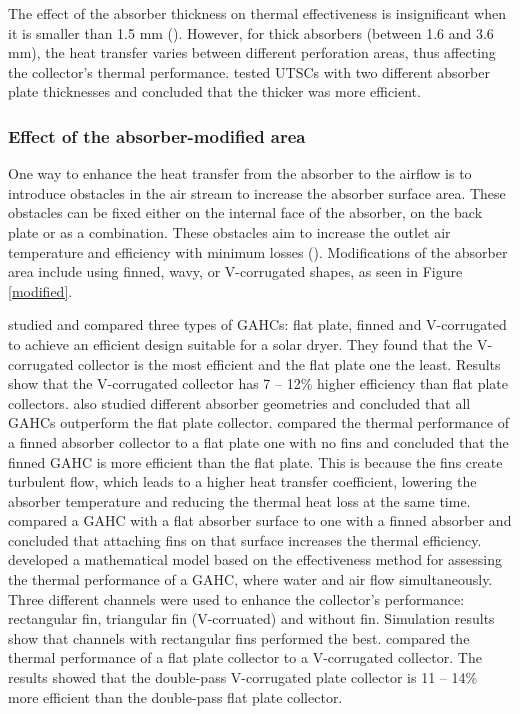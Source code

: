 The effect of the absorber thickness on thermal effectiveness is insignificant when it is smaller than 1.5 mm (\cite{Kutscher1994}). However, for thick absorbers (between 1.6 and 3.6 mm), the heat transfer varies between different perforation areas, thus affecting the collector's thermal performance. \citet{Zomorodian2012} tested UTSCs with two different absorber plate thicknesses and concluded that the thicker was more efficient.

\subsubsection{Effect of the absorber-modified area}

One way to enhance the heat transfer from the absorber to the airflow is to introduce obstacles in the air stream to increase the absorber surface area. These obstacles can be fixed either on the internal face of the absorber, on the back plate or as a combination. These obstacles aim to increase the outlet air temperature and efficiency with minimum losses (\cite{Karsli2007}). Modifications of the absorber area include using finned, wavy, or V-corrugated shapes, as seen in Figure \ref{modified}.


\citet{Karim2004} studied and compared three types of GAHCs: flat plate, finned and V-corrugated to achieve an efficient design suitable for a solar dryer. They found that the V-corrugated collector is the most efficient and the flat plate one the least. Results show that the V-corrugated collector has 7 -- 12\% higher efficiency than flat plate collectors. \citet{Kurtbas2004} also studied different absorber geometries and concluded that all GAHCs outperform the flat plate collector. \citet{Karsli2007} compared the thermal performance of a finned absorber collector to a flat plate one with no fins and concluded that the finned GAHC is more efficient than the flat plate. This is because the fins create turbulent flow, which leads to a higher heat transfer coefficient, lowering the absorber temperature and reducing the thermal heat loss at the same time. \citet{Alta2010} compared a GAHC with a flat absorber surface to one with a finned absorber and concluded that attaching fins on that surface increases the thermal efficiency. \citet{Assari2011} developed a mathematical model based on the effectiveness method for assessing the thermal performance of a GAHC, where water and air flow simultaneously. Three different channels were used to enhance the collector's performance: rectangular fin, triangular fin (V-corruated) and without fin. Simulation results show that channels with rectangular fins performed the best. \citet{ElSebaii2011} compared the thermal performance of a flat plate collector to a V-corrugated collector. The results showed that the double-pass V-corrugated plate collector is 11 -- 14\% more efficient than the double-pass flat plate collector.

